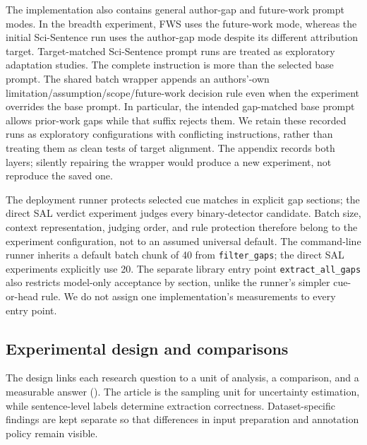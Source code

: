 The implementation also contains general author-gap and future-work prompt modes. In the
breadth experiment, FWS uses the future-work mode, whereas the initial Sci-Sentence run uses
the author-gap mode despite its different attribution target. Target-matched Sci-Sentence prompt
runs are treated as exploratory adaptation studies. The complete instruction is more than the selected base prompt. The shared batch wrapper
appends an authors'-own limitation/assumption/scope/future-work decision rule even when the
experiment overrides the base prompt. In particular, the intended gap-matched base prompt allows
prior-work gaps while that suffix rejects them. We retain these recorded runs as exploratory
configurations with conflicting instructions, rather than treating them as clean tests of target
alignment. The appendix records both layers; silently repairing the wrapper would produce a new
experiment, not reproduce the saved one.

The deployment runner protects selected cue
matches in explicit gap sections; the direct SAL verdict experiment judges every binary-detector
candidate. Batch size, context representation, judging order, and rule protection therefore
belong to the experiment configuration, not to an assumed universal default. The command-line
runner inherits a default batch chunk of 40 from \texttt{filter\_gaps}; the direct SAL experiments
explicitly use 20. The separate library entry point \texttt{extract\_all\_gaps} also restricts
model-only acceptance by section, unlike the runner's simpler cue-or-head rule. We do not assign
one implementation's measurements to every entry point.

\subsection{Experimental design and comparisons}
\label{sec:experimental-design}

The design links each research question to a unit of analysis, a comparison, and a measurable
answer (). The article is the sampling unit for uncertainty estimation, while
sentence-level labels determine extraction correctness. Dataset-specific findings are kept
separate so that differences in input preparation and annotation policy remain visible.

